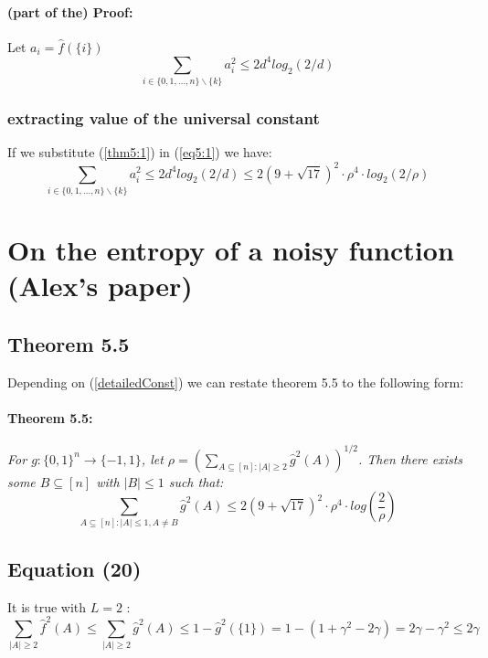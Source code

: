 \documentclass{article}
\begin{document}
				\paragraph{(part of the) Proof:}
					Let $a_i = \hat{f}(\{i\})$
					\begin{equation} \label{eq5:1}
						\sum_{i \in \{0,1, \dots , n\} \backslash \{k\}} a_i^2 \leq 2d^4log_2(2/d)
					\end{equation}		
			\subsubsection{extracting value of the universal constant}
				If we substitute (\ref{thm5:1}) in (\ref{eq5:1}) we have:
				\begin{equation} \label{detailedConst}
					\sum_{i \in \{0,1, \dots , n\} \backslash \{k\}} a_i^2 
					\leq 2d^4log_2(2/d) 
					\leq 2 \left( 9 + \sqrt{17} \right) ^ 2 \cdot \rho^4 \cdot log_2(2/\rho)
				\end{equation}
	
	
	\newpage
	\section{On the entropy of a noisy function (Alex's paper)}
		\subsection{Theorem 5.5}
			Depending on (\ref{detailedConst}) we can restate theorem 5.5 to the following form:
			\paragraph{Theorem 5.5:} \textit{For $ g: \{0,1\}^n \rightarrow \{-1,1\}$, let $\rho = \left( \sum_{A \subseteq [n]: |A| \geq 2} \hat{g}^2(A) \right) ^ {1/2} $. Then there exists some $ B \subseteq [n]$ with $|B| \leq 1$ such that:}
				$$  \sum_{A \subseteq [n]: |A| \leq 1, A \neq B} \hat{g}^2 (A) \leq 2 \left( 9 + \sqrt{17} \right)^2 \cdot \rho^4 \cdot log \left( \frac{2}{\rho} \right) $$
	
		\subsection{Equation (20)}
			It is true with $L=2$ :
			\begin{equation} \label{eq:20}
				\sum_{|A| \geq 2} \hat{f}^2 (A) 
				\leq \sum_{|A| \geq 2} \hat{g}^2 (A) 
				\leq 1 - \hat{g}^2(\{1\}) = 1 - \left( 1 + \gamma^2 - 2 \gamma \right) = 2 \gamma - \gamma^2 
				\leq 2 \gamma
			\end{equation}
	
\end{document}

